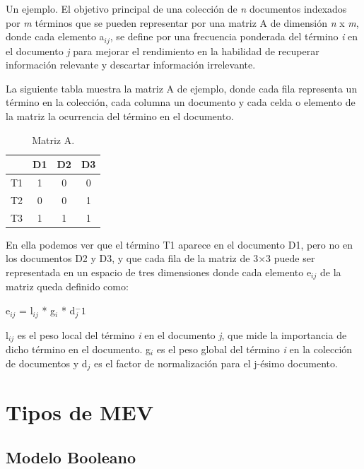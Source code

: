 \documentclass[titlepage]{article}
\begin{document}
Un ejemplo. El objetivo principal de una colección de \textit{n} documentos indexados por \textit{m} términos que se pueden representar por una matriz A de dimensión \textit{n} x \textit{m}, donde cada elemento a$_{ij}$, se define por una frecuencia ponderada del término \textit{i} en el documento \textit{j} para mejorar el rendimiento en la habilidad de recuperar información relevante y descartar información irrelevante. 

La siguiente tabla muestra la matriz A de ejemplo, donde cada fila representa un término en la colección, cada columna un documento y cada celda o elemento de la matriz la ocurrencia del término en el documento.

\renewcommand{\figurename}{Figura}
\renewcommand{\tablename}{Tabla} 

\begin{table}[h]
	\begin{center}
		\begin{tabular}{ |c|c|c|c| }
			\hline 
			& D1 & D2 & D3 \\
			\hline
			T1 & 1 & 0 & 0 \\ 
			\hline
			T2 & 0 & 0	& 1 \\ 
			\hline
			T3 & 1 & 1	& 1 \\
			\hline
		\end{tabular}
		\caption{Matriz A.}
		\label{fig: Table 1}
	\end{center}
\end{table}

En ella podemos ver que el término T1 aparece en el documento D1, pero no en los documentos D2 y D3, y que cada fila de la matriz de 3×3 puede ser representada en un espacio de tres dimensiones donde cada elemento e$_{ij}$ de la matriz queda definido como: 

\begin{center}
	e$_{ij}$ = l$_{ij}$ * g$_{i}$ * d$_{j}^-1$
\end{center}

l$_{ij}$ es el peso local del término \textit{i} en el documento \textit{j}, que mide la importancia de dicho término en el documento. g$_{i}$ es el peso global del término \textit{i} en la colección de documentos y d$_{j}$ es el factor de normalización para el j-ésimo documento.

\section{Tipos de MEV}

\subsection{Modelo Booleano}
\end{document}
